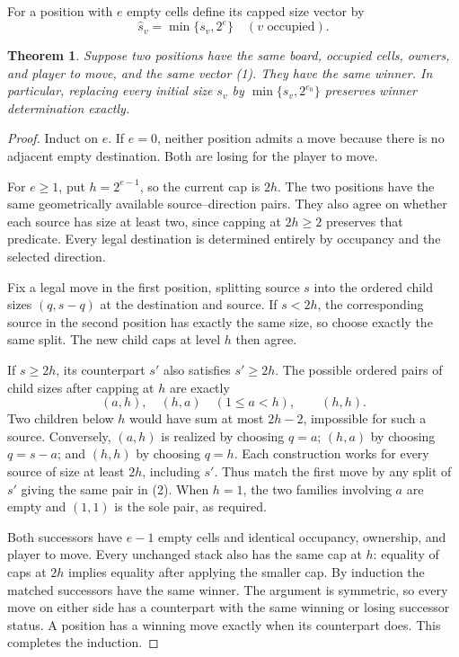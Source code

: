 \documentclass[11pt]{article}
\newtheorem{theorem}{Theorem}
\begin{document}
For a position with $e$ empty cells define its capped size vector by
\[
                         \widehat s_v=\min\{s_v,2^e\}
                    \quad(v\text{ occupied}).                   \tag{1}
\]
\begin{theorem}
Suppose two positions have the same board, occupied cells, owners, and
player to move, and the same vector (1). They have the same winner.
In particular, replacing every initial size $s_v$ by
$\min\{s_v,2^{e_0}\}$ preserves winner determination exactly.
\end{theorem}
\begin{proof}
Induct on $e$. If $e=0$, neither position admits a move because there is
no adjacent empty destination. Both are losing for the player to move.

For $e\geq1$, put $h=2^{e-1}$, so the current cap is $2h$. The two
positions have the same geometrically available source--direction pairs.
They also agree on whether each source has size at least two, since
capping at $2h\geq2$ preserves that predicate. Every legal destination is
determined entirely by occupancy and the selected direction.

Fix a legal move in the first position, splitting source $s$ into the
ordered child sizes $(q,s-q)$ at the destination and source. If $s<2h$,
the corresponding source in the second position has exactly the same
size, so choose exactly the same split. The new child caps at level $h$
then agree.

If $s\geq2h$, its counterpart $s'$ also satisfies $s'\geq2h$. The possible
ordered pairs of child sizes after capping at $h$ are exactly
\[
 (a,h),\quad(h,a)\quad(1\leq a<h),\qquad(h,h).                    \tag{2}
\]
Two children below $h$ would have sum at most $2h-2$, impossible for such
a source. Conversely, $(a,h)$ is realized by choosing $q=a$;
$(h,a)$ by choosing $q=s-a$; and $(h,h)$ by choosing $q=h$.
Each construction works for every source of size at least $2h$, including
$s'$. Thus match the first move by any split of $s'$ giving the same pair
in (2). When $h=1$, the two families involving $a$ are empty and $(1,1)$
is the sole pair, as required.

Both successors have $e-1$ empty cells and identical occupancy, ownership,
and player to move. Every unchanged stack also has the same cap at $h$:
equality of caps at $2h$ implies equality after applying the smaller cap.
By induction the matched successors have the same winner. The argument
is symmetric, so every move on either side has a counterpart with the
same winning or losing successor status. A position has a winning move
exactly when its counterpart does. This completes the induction.
\end{proof}
\end{document}
